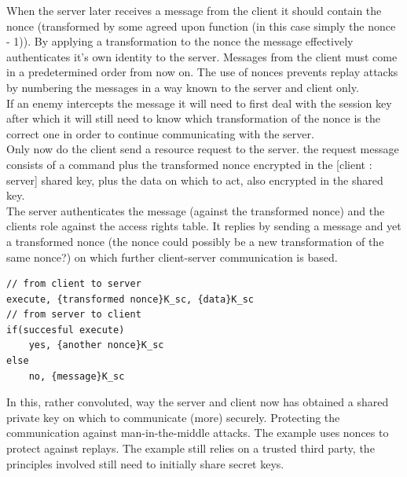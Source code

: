 When the server later receives a message from the client it should contain the nonce (transformed by some agreed upon function (in this case simply the nonce - 1)). By applying a transformation to the nonce the message effectively authenticates it's own identity to the server. Messages from the client must come in a predetermined order from now on. The use of nonces prevents replay attacks by numbering the messages in a way known to the server and client only. \\

If an enemy intercepts the message it will need to first deal with the session key after which it will still need to know which transformation of the nonce is the correct one in order to continue communicating with the server. \\

Only now do the client send a resource request to the server. the request message consists of a command plus the transformed nonce encrypted in the [client : server] shared key, plus the data on which to act, also encrypted in the shared key. \\

The server authenticates the message (against the transformed nonce) and the clients role against the access rights table. It replies by sending a message and yet a transformed nonce (the nonce could possibly be a new transformation of the same nonce?) on which further client-server communication is based.


\begin{lstlisting}
// from client to server
execute, {transformed nonce}K_sc, {data}K_sc
// from server to client
if(succesful execute)
	yes, {another nonce}K_sc
else
	no, {message}K_sc
\end{lstlisting}

In this, rather convoluted, way the server and client now has obtained a shared private key on which to communicate (more) securely. Protecting the communication against man-in-the-middle attacks. The example uses nonces to protect against replays. The example still relies on a trusted third party, the principles involved still need to initially share secret keys.  \\
 

